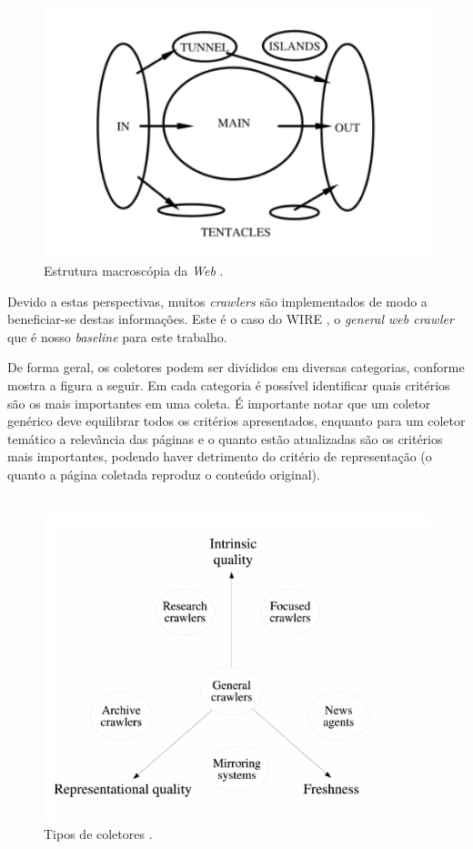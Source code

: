 \documentclass[a4paper,12pt,titlepage]{article}
\begin{document}
\begin{figure}[H]
     \centering
     \includegraphics[scale=0.7]{figures/macroscopic-structure-web.png}
     \caption{Estrutura macroscópia da \textit{Web} \cite{broder}.}
     \label{bsp}
\end{figure}

Devido a estas perspectivas, muitos \textit{crawlers} são implementados de modo a beneficiar-se destas informações. Este é o caso do WIRE \cite{carlos}, o \textit{general web crawler} que é nosso \textit{baseline} para este trabalho. 

De forma geral, os coletores podem ser divididos em diversas categorias, conforme mostra a figura a seguir. Em cada categoria é possível identificar quais critérios são os mais importantes em uma coleta. É importante notar que um coletor genérico deve equilibrar todos os critérios apresentados, enquanto para um coletor temático a relevância das páginas e o quanto estão atualizadas são os critérios mais importantes, podendo haver detrimento do critério de representação (o quanto a página coletada reproduz o conteúdo original). 
\\ \ 

\begin{figure}[H]
     \centering
     \includegraphics[scale=0.4]{figures/crawlers-types.png}
     \caption{Tipos de coletores \cite{carlos}.}
     \label{bsp}
\end{figure}
\end{document}
